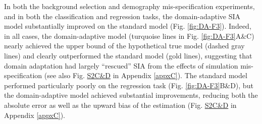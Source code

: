 In both the background selection and demography mis-specification experiments, and in both the classification and regression tasks, the domain-adaptive \ac{SIA} model substantially improved on the standard model (Fig. \ref{fig:DA-F3}). Indeed, in all cases, the domain-adaptive model (turquoise lines in Fig. \ref{fig:DA-F3}A\&C) nearly achieved the upper bound of the hypothetical true model (dashed gray lines) and clearly outperformed the standard model (gold lines), suggesting that domain adaptation had largely “rescued” \ac{SIA} from the effects of simulation mis-specification (see also Fig. \href{https://journals.plos.org/plosgenetics/article?id=10.1371/journal.pgen.1011032#sec018}{S2C\&D} in Appendix \ref{appxC}). The standard model performed particularly poorly on the regression task (Fig. \ref{fig:DA-F3}B\&D), but the domain-adaptive model achieved substantial improvements, reducing both the absolute error as well as the upward bias of the estimation (Fig. \href{https://journals.plos.org/plosgenetics/article?id=10.1371/journal.pgen.1011032#sec018}{S2C\&D} in Appendix \ref{appxC}).

